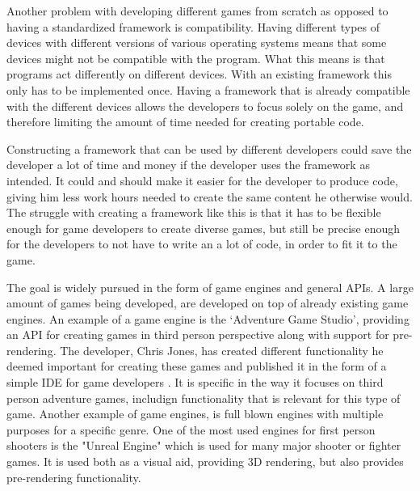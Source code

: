 Another problem with developing different games from scratch as opposed to having a standardized framework is compatibility. Having different types of devices with different versions of various operating systems means that some devices might not be compatible with the program. What this means is that programs act differently on different devices. With an existing framework this only has to be implemented once. Having a framework that is already compatible with the different devices allows the developers to focus solely on the game, and therefore limiting the amount of time needed for creating portable code.

Constructing a framework that can be used by different developers could save the developer a lot of time and money if the developer uses the framework as intended. It could and should make it easier for the developer to produce code, giving him less work hours needed to create the same content he otherwise would. The struggle with creating a framework like this is that it has to be flexible enough for game developers to create diverse games, but still be precise enough for the developers to not have to write an a lot of code, in order to fit it to the game.

The goal is widely pursued in the form of game engines and general APIs. A large amount of games being developed, are developed on top of already existing game engines. An example of a game engine is the `Adventure Game Studio', providing an API for creating games in third person perspective along with support for pre-rendering. The developer, Chris Jones, has created different functionality he deemed important for creating these games and published it in the form of a simple IDE for game developers \cite{adv-game}. It is specific in the way it focuses on third person adventure games, includign functionality that is relevant for this type of game.
Another example of game engines, is full blown engines with multiple purposes for a specific genre. One of the most used engines for first person shooters is the "Unreal Engine" which is used for many major shooter or fighter games. It is used both as a visual aid, providing 3D rendering, but also provides pre-rendering functionality.




